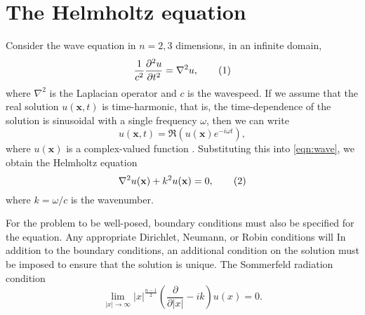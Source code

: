 
\iffalse Brief outline of the chapter below

Background:
	What is HH equation?
	What does it model?
	How is it derived?
	Boundary conditions
	- 	Sommerfield radiation condition
	
Finite element method:
	Discretisation of HH
	Discretisation of infinite domains
		D,N,radiation
	ABC, DtN, PML

Linear solvers:
	Iterative and direct
	Krylov methods
	Preconditioners
	How does this relate to Poisson and HH?
	- 	Small wavenumbers good convergence

Project direction:
	Where are we going? What to do...?
	Multigrid in non-cartesian coordinates
	Fourier decompostion of HH
	Explore implementation of PMLs
\fi


\section{The Helmholtz equation}

Consider the wave equation in $n=2,3$ dimensions, in an infinite 
domain,
\[
	\frac{1}{c^2} \frac{\partial^2 u}{\partial t^2} = 
		\nabla^2 u,\addtag \label{eqn:wave}
\]
where $\nabla^2$ is the Laplacian operator and $c$ is the wavespeed.
If we assume that the real solution $u(\mathbf{x},t)$ is time-harmonic, that is, the time-dependence of the solution is sinusoidal with a single frequency $\omega$, then we can write
\[
	u(\mathbf{x},t) = 
		\Re \left( u(\mathbf{x})e^{-i\omega t} \right),
\]
where $u(\mathbf{x})$ is a complex-valued function \citep{oomph_hh}.
Substituting this into \eqref{eqn:wave}, we obtain the Helmholtz equation
\[
	\nabla^2 u(\mathbf{x}) + k^2 u(\mathbf{x}) = 0, \addtag \label{eqn:hh}
\]
where $k=\omega/c$ is the wavenumber.

For the problem to be well-posed, boundary conditions must also be specified for the equation.
Any appropriate Dirichlet, Neumann, or Robin conditions will 
In addition to the boundary conditions, an additional condition on the solution must be imposed to ensure that the solution is unique. 
The Sommerfeld radiation condition \citep{sommerfeld}
\[
\lim_{|x|\rightarrow \infty} |x|^{\frac{n-1}{2}} \left( \frac{\partial}{\partial |x|} - ik \right) u(x) = 0.
\]





